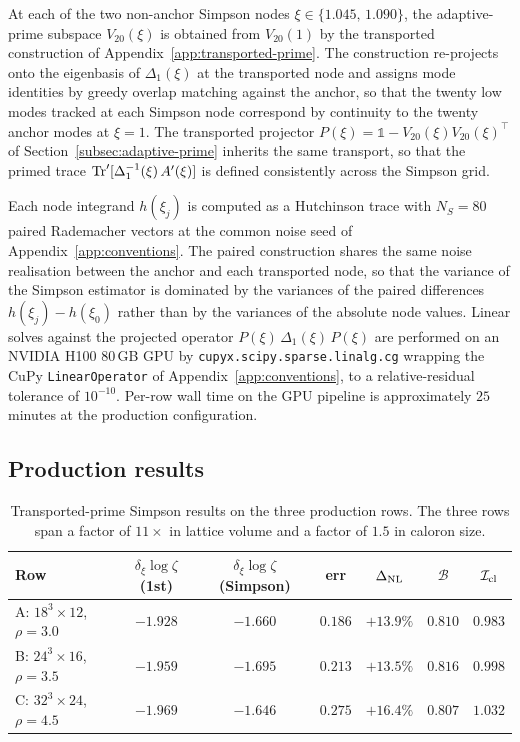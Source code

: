 \documentclass[a4paper,11pt]{article}
\theoremstyle{definition}
\newcommand{\Tr}{\mathop{\rm Tr}}
\newcommand{\Icl}{\mathcal{I}_{\rm cl}}
\newcommand{\Bobs}{\mathcal{B}}
\begin{document}
At each of the two non-anchor Simpson nodes
$\xi \in \{1.045,\,1.090\}$, the adaptive-prime subspace
$V_{20}(\xi)$ is obtained from $V_{20}(1)$ by the transported
construction of Appendix~\ref{app:transported-prime}. The
construction re-projects onto the eigenbasis of $\Delta_1(\xi)$ at
the transported node and assigns mode identities by greedy overlap
matching against the anchor, so that the twenty low modes tracked
at each Simpson node correspond by continuity to the twenty anchor
modes at $\xi = 1$. The transported projector
$P(\xi) = \mathbb{1} - V_{20}(\xi)V_{20}(\xi)^{\!\top}$
of Section~\ref{subsec:adaptive-prime} inherits the same transport,
so that the primed trace $\Tr'[\Delta_1^{-1}(\xi)\,A'(\xi)]$ is
defined consistently across the Simpson grid.

Each node integrand $h(\xi_j)$ is computed as a Hutchinson trace
with $N_S = 80$ paired Rademacher vectors at the common noise seed
of Appendix~\ref{app:conventions}. The paired construction shares
the same noise realisation between the anchor and each transported
node, so that the variance of the Simpson estimator is dominated by
the variances of the paired differences $h(\xi_j) - h(\xi_0)$
rather than by the variances of the absolute node values. Linear
solves against the projected operator
$P(\xi)\,\Delta_1(\xi)\,P(\xi)$ are performed on an NVIDIA H100
$80$\,GB GPU by \texttt{cupyx.scipy.sparse.linalg.cg} wrapping the
CuPy \texttt{LinearOperator} of Appendix~\ref{app:conventions}, to
a relative-residual tolerance of $10^{-10}$. Per-row wall time on
the GPU pipeline is approximately $25$ minutes at the production
configuration.

\subsection{Production results}
\label{subsec:production-results}

\begin{table}[h]
\centering
\begin{tabular}{lcccccc}
\toprule
Row & $\delta_\xi \log\zeta$ (1st) & $\delta_\xi \log\zeta$ (Simpson) &
err & $\Delta_{\rm NL}$ & $\Bobs$ & $\Icl$ \\
\midrule
A: $18^3\times 12$, $\rho=3.0$
  & $-1.928$ & $-1.660$ & $0.186$ & $+13.9\%$ & $0.810$ & $0.983$ \\
B: $24^3\times 16$, $\rho=3.5$
  & $-1.959$ & $-1.695$ & $0.213$ & $+13.5\%$ & $0.816$ & $0.998$ \\
C: $32^3\times 24$, $\rho=4.5$
  & $-1.969$ & $-1.646$ & $0.275$ & $+16.4\%$ & $0.807$ & $1.032$ \\
\bottomrule
\end{tabular}
\caption{Transported-prime Simpson results on the three production
rows. The three rows span a factor of $11\times$ in lattice volume
and a factor of $1.5$ in caloron size.}
\label{tab:production-results}
\end{table}
\end{document}
